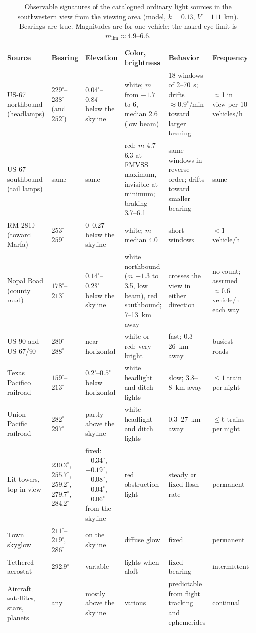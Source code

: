 \documentclass[aip,jap,amsmath,amssymb,reprint,floatfix]{revtex4-2}
\begin{document}
\begin{table}[t]
\caption{Observable signatures of the catalogued ordinary light sources in the southwestern view from the viewing area (model, $k=0.13$, $V=111$~km). Bearings are true. Magnitudes are for one vehicle; the naked-eye limit is $m_{\mathrm{lim}}\approx4.9$--6.6.}
\label{tab:signatures}
\begin{ruledtabular}
\footnotesize
\begin{tabular}{p{2.5cm}p{2.1cm}p{2.1cm}p{3.3cm}p{3.5cm}p{2.1cm}}
Source & Bearing & Elevation & Color, brightness & Behavior & Frequency\\
\hline
US-67 northbound (headlamps) & $229^\circ$--$238^\circ$ (and $252^\circ$) & $0.04^\circ$--$0.84^\circ$ below the skyline & white; $m$ from $-1.7$ to 6, median 2.6 (low beam) & 18 windows of 2--70~s; drifts $\approx0.9^\circ$/min toward larger bearing & $\approx$1 in view per 10 vehicles/h\\
US-67 southbound (tail lamps) & same & same & red; $m$ 4.7--6.3 at FMVSS maximum, invisible at minimum; braking 3.7--6.1 & same windows in reverse order; drifts toward smaller bearing & same\\
RM 2810 (toward Marfa) & $253^\circ$--$259^\circ$ & 0--$0.27^\circ$ below the skyline & white; $m$ median 4.0 & short windows & $<1$ vehicle/h\\
Nopal Road (county road) & $178^\circ$--$213^\circ$ & $0.14^\circ$--$0.28^\circ$ below the skyline & white northbound ($m$ $-1.3$ to 3.5, low beam), red southbound; 7--13~km away & crosses the view in either direction & no count; assumed $\approx$0.6 vehicle/h each way\\
US-90 and US-67/90 & $280^\circ$--$288^\circ$ & near horizontal & white or red; very bright & fast; 0.3--26~km away & busiest roads\\
Texas Pacifico railroad & $159^\circ$--$213^\circ$ & $0.2^\circ$--$0.5^\circ$ below horizontal & white headlight and ditch lights & slow; 3.8--8~km away & $\le1$ train per night\\
Union Pacific railroad & $282^\circ$--$297^\circ$ & partly above the skyline & white headlight and ditch lights & 0.3--27~km away & $\le6$ trains per night\\
Lit towers, top in view & $230.3^\circ$, $255.7^\circ$, $259.2^\circ$, $279.7^\circ$, $284.2^\circ$ & fixed: $-0.34^\circ$, $-0.19^\circ$, $+0.08^\circ$, $-0.04^\circ$, $+0.06^\circ$ from the skyline & red obstruction light & steady or fixed flash rate & permanent\\
Town skyglow & $211^\circ$--$219^\circ$, $286^\circ$ & on the skyline & diffuse glow & fixed & permanent\\
Tethered aerostat & $292.9^\circ$ & variable & lights when aloft & fixed bearing & intermittent\\
Aircraft, satellites, stars, planets & any & mostly above the skyline & various & predictable from flight tracking and ephemerides & continual\\
\end{tabular}
\end{ruledtabular}
\end{table}
\end{document}

